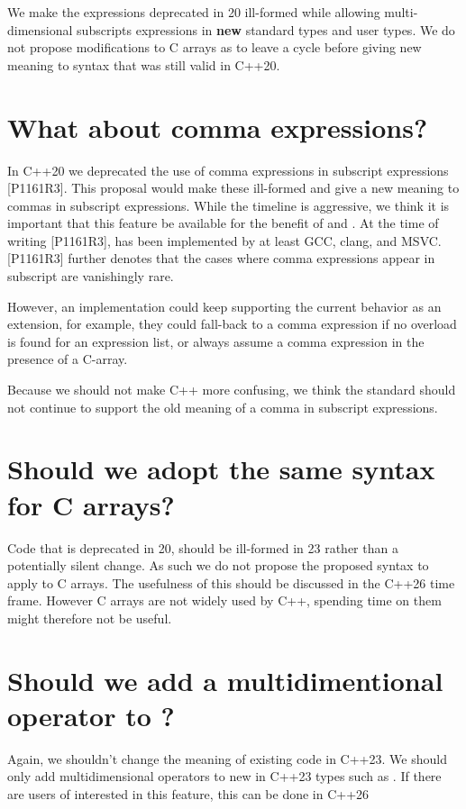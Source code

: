\documentclass{wg21}
\begin{document}
We make the expressions deprecated in 20 ill-formed while allowing multi-dimensional subscripts expressions in \textbf{new} standard types
and user types. We do not propose modifications to C arrays as to leave a cycle before giving new meaning to syntax that was still valid in C++20.

\section{What about comma expressions?}

In C++20 we deprecated the use of comma expressions in subscript expressions [P1161R3]\cite{P1161R3}.
This proposal would make these ill-formed and give a new meaning to commas in subscript expressions.
While the timeline is aggressive, we think it is important that this feature be available for the benefit of  and .
At the time of writing [P1161R3], \cite{P1161R3} has been implemented by at least GCC, clang, and MSVC.
[P1161R3]\cite{P1161R3} further denotes that the cases where comma expressions appear in subscript are vanishingly rare.

However, an implementation could keep supporting the current behavior as an extension, for example, they could fall-back to a comma expression if no overload is found for an expression list, or always assume a comma expression in the presence of a C-array.

Because we should not make C++ more confusing, we think the standard should not continue to support the old meaning of a comma
in subscript expressions.

\section{Should we adopt the same syntax for C arrays?}

Code that is deprecated in 20, should be ill-formed in 23 rather than a potentially silent change.
As such we do not propose the proposed syntax to apply to C arrays.
The usefulness of this should be discussed in the C++26 time frame.
However C arrays are not widely used by C++, spending time on them might therefore not be useful.

\section{Should we add a multidimentional operator to ?}

Again, we shouldn't change the meaning of existing code in C++23.
We should only add multidimensional operators to new in C++23 types such as .
If there are users of  interested in this feature, this can be done in C++26
\end{document}

